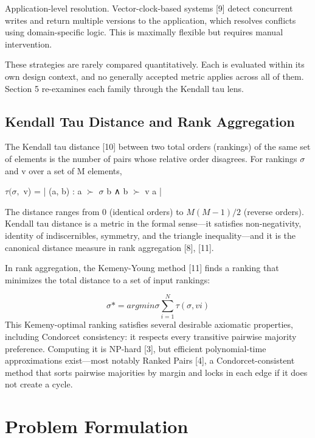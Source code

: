 \documentclass[10pt,twocolumn]{article}
\begin{document}
Application-level resolution. Vector-clock-based systems [9] detect concurrent writes and return multiple versions to the application, which resolves conflicts using domain-specific logic. This is maximally flexible but requires manual intervention.

These strategies are rarely compared quantitatively. Each is evaluated within its own design context, and no generally accepted metric applies across all of them. Section 5 re-examines each family through the Kendall tau lens.

\subsection{Kendall Tau Distance and Rank Aggregation}
The Kendall tau distance [10] between two total orders (rankings) of the same set of elements is the number of pairs whose relative order disagrees. For rankings $\sigma$ and v over a set of M elements,

$\tau(\sigma,$ v) = |{ (a, b) : a $\succ$ $\sigma$ b ∧ b $\succ$ v a }|

The distance ranges from 0 (identical orders) to $M(M-1)/2$ (reverse orders). Kendall tau distance is a metric in the formal sense—it satisfies non-negativity, identity of indiscernibles, symmetry, and the triangle inequality—and it is the canonical distance measure in rank aggregation [8], [11].

In rank aggregation, the Kemeny-Young method [11] finds a ranking that minimizes the total distance to a set of input rankings:

\[ \sigma* = arg min \sigma \sum_{i=1}^{N} \tau(\sigma, v i) \]
This Kemeny-optimal ranking satisfies several desirable axiomatic properties, including Condorcet consistency: it respects every transitive pairwise majority preference. Computing it is NP-hard [3], but efficient polynomial-time approximations exist—most notably Ranked Pairs [4], a Condorcet-consistent method that sorts pairwise majorities by margin and locks in each edge if it does not create a cycle.

\section{Problem Formulation}
\end{document}
